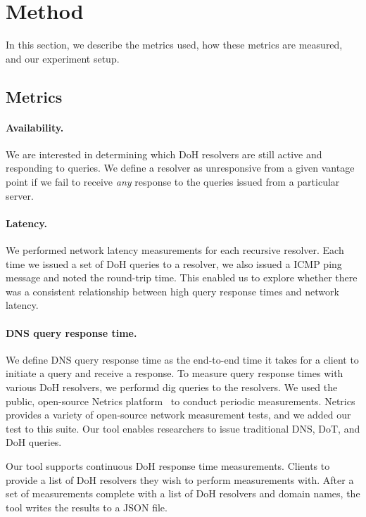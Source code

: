 \section{Method}\label{sec:method} In this section, we describe the metrics
used, how these metrics are measured, and our experiment setup.

\subsection{Metrics} 

\paragraph{Availability.} We are interested in determining which DoH
resolvers are still active and responding to queries.  We define a resolver as
unresponsive from a given vantage point if we fail to receive \emph{any}
response to the queries issued from a particular server.

\paragraph{Latency.} We
performed network latency measurements for each recursive resolver.  Each time
we issued a set of DoH queries to a resolver, we also issued a ICMP ping
message and noted the round-trip time.  This enabled us to explore
whether there was a consistent relationship between high query response times
and network latency.


\paragraph{DNS query response time.} We define DNS query response time as the
end-to-end time it takes for a client to initiate a query and receive a
response.  To measure query response times with various DoH resolvers, we
performd dig queries to the resolvers. We used the public, open-source Netrics
platform~\cite{netrics} to conduct periodic measurements. Netrics
provides a variety of open-source network measurement tests, and we added our 
test to this suite. Our tool enables researchers to issue
traditional DNS, DoT, and DoH queries.

Our tool supports continuous DoH response time measurements. Clients to provide
a list of DoH resolvers they wish to perform measurements with. After a set of 
measurements complete with a list of DoH resolvers and domain names, the tool
writes the results to a JSON file.

